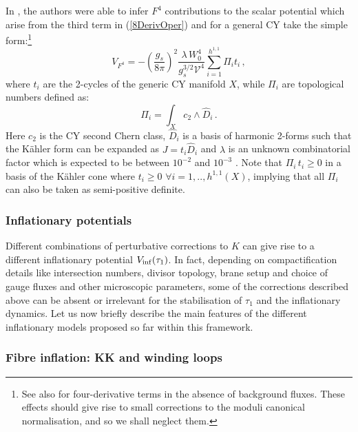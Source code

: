 \documentclass[11pt,a4paper]{article}
\newcommand{\be}{\begin{equation}}
\newcommand{\ee}{\end{equation}}
\newcommand\vo{{\mathcal{V}}}
\begin{document}
In \cite{Ciupke:2015msa}, the authors were able to infer $F^4$ contributions to the scalar potential which arise from the third term in (\ref{8DerivOper}) and for a general CY take the simple form:\footnote{See also \cite{Weissenbacher:2016gey} for four-derivative terms in the absence of background fluxes. These effects should give rise to small corrections to the moduli canonical normalisation, and so we shall neglect them.}
\be 
V_{F^4} = - \left(\frac{g_s}{8 \pi}\right)^2 \frac{\lambda\,W_0^4}{g_s^{3/2} \vo^4} \sum_{i=1}^{h^{1,1}}\Pi_i t_i \,,
\label{VF4}
\ee 
where $t_i$ are the 2-cycles of the generic CY manifold $X$, while $\Pi_i$ are topological numbers defined as:
\be 
\Pi_i = \int_X c_2 \wedge \hat{D}_i \,.
\label{Pii}
\ee 
Here $c_2$ is the CY second Chern class, $\hat{D}_i$ is a basis of harmonic 2-forms such that the K\"ahler form can be expanded as $J = t_i \hat{D}_i$ and $\lambda$ is an unknown combinatorial factor which is expected to be between $10^{-2}$ and $10^{-3}$ \cite{Ciupke:2015msa}. Note that $\Pi_i \,t_i \geq 0$ in a basis of the K\"ahler cone where $t_i \geq 0$ $\forall i=1,..,h^{1,1}(X)$, implying that all $\Pi_i$ can also be taken as semi-positive definite. 


\subsubsection{Inflationary potentials}
\label{InflationaryModels}

Different combinations of perturbative corrections to $K$ can give rise to a different inflationary potential $V_{\rm inf}(\tau_1)$. In fact, depending on compactification details like intersection numbers, divisor topology, brane setup and choice of gauge fluxes and other microscopic parameters, some of the corrections described above can be absent or irrelevant for the stabilisation of $\tau_1$ and the inflationary dynamics. Let us now briefly describe the main features of the different inflationary models proposed so far within this framework.


\subsubsection*{Fibre inflation: KK and winding loops}
\end{document}

